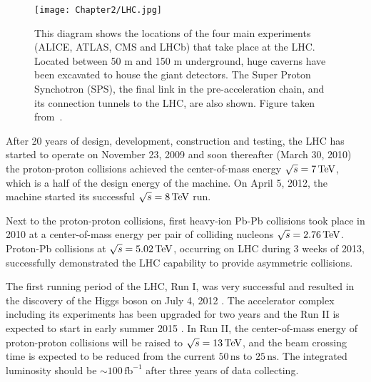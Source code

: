 \begin{figure}[t]
  \centering
  \texttt{[image: Chapter2/LHC.jpg]}
  \caption[This diagram shows the locations of the four main experiments (ALICE,
          ATLAS, CMS and LHCb) that take place at the LHC. Located between 50 m and
          150 m underground, huge caverns have been excavated to house the giant
          detectors. The Super Proton Synchotron (SPS), the final link in the
          pre-acceleration chain, and its connection tunnels to the LHC, are also
          shown.]
          {This diagram shows the locations of the four main experiments (ALICE,
          ATLAS, CMS and LHCb) that take place at the LHC. Located between 50 m and
          150 m underground, huge caverns have been excavated to house the giant
          detectors. The Super Proton Synchotron (SPS), the final link in the
          pre-acceleration chain, and its connection tunnels to the LHC, are also
          shown.  Figure taken from~\cite{CERN:ATLASexperimentPictureswiki}.  }
  \label{fig:LHC}
\end{figure}

After 20 years of design, development, construction and testing, the LHC has
started to operate on November 23, 2009 and soon thereafter (March 30, 2010) the
proton-proton collisions achieved the center-of-mass energy $\sqrt{s} = 7 \,\text{TeV}$,
which is a half of the design energy of the machine. On April 5, 2012, the
machine started its successful $\sqrt{s} = 8 \,\text{TeV}$ run.

Next to the proton-proton collisions, first heavy-ion Pb-Pb collisions took place
in 2010 at a center-of-mass energy per pair of colliding nucleons $\sqrt{s} =
2.76 \,\text{TeV}$. Proton-Pb collisions at $\sqrt{s} = 5.02 \,\text{TeV}$, occurring on LHC
during 3 weeks of 2013, successfully demonstrated the LHC capability to provide
asymmetric collisions.  

The first running period of the LHC, Run I, was very successful and resulted in
the discovery of the Higgs boson on July 4, 2012 \cite{HiggsDiscovery}.  The
accelerator complex including its experiments has been upgraded for two years
and the Run II is expected to start in early summer 2015 \cite{LHCFuture,
LHCFutureLuminosigy}. In Run II, the center-of-mass energy of proton-proton
collisions will be raised to $\sqrt{s} = 13 \,\text{TeV}$, and the beam crossing time
is expected to be reduced from the current $50\,\text{ns}$ to $25\,\text{ns}$. The
integrated luminosity should be $\sim 100\,\text{fb}^{-1}$ after three years of
data collecting.

